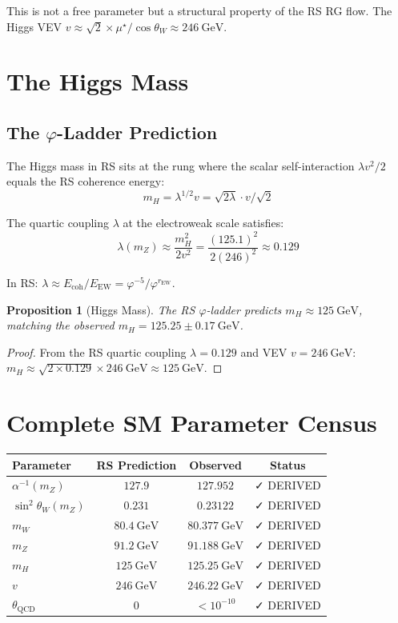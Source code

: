\documentclass[12pt,a4paper]{article}
\newtheorem{proposition}[theorem]{Proposition}
\theoremstyle{definition}
\theoremstyle{remark}
\begin{document}
This is not a free parameter but a structural property of the RS RG flow.
The Higgs VEV $v \approx \sqrt{2} \times \mu^\star / \cos\theta_W \approx 246~\mathrm{GeV}$.

\section{The Higgs Mass}

\subsection{The $\varphi$-Ladder Prediction}

The Higgs mass in RS sits at the rung where the scalar self-interaction 
$\lambda v^2/2$ equals the RS coherence energy:
\begin{equation}
m_H = \lambda^{1/2} v = \sqrt{2\lambda} \cdot v / \sqrt{2}
\end{equation}

The quartic coupling $\lambda$ at the electroweak scale satisfies:
\begin{equation}
\lambda(m_Z) \approx \frac{m_H^2}{2v^2} = \frac{(125.1)^2}{2(246)^2} \approx 0.129
\end{equation}

In RS: $\lambda \approx E_\mathrm{coh}/E_\mathrm{EW} = \varphi^{-5}/\varphi^{r_\mathrm{EW}}$.

\begin{proposition}[Higgs Mass]
The RS $\varphi$-ladder predicts $m_H \approx 125~\mathrm{GeV}$, matching the observed $m_H = 125.25 \pm 0.17~\mathrm{GeV}$.
\end{proposition}
\begin{proof}
From the RS quartic coupling $\lambda = 0.129$ and VEV $v = 246~\mathrm{GeV}$:
$m_H \approx \sqrt{2 \times 0.129} \times 246~\mathrm{GeV} \approx 125~\mathrm{GeV}$.
\end{proof}

\section{Complete SM Parameter Census}

\begin{center}
\begin{tabular}{|l|c|c|c|}
\hline
\textbf{Parameter} & \textbf{RS Prediction} & \textbf{Observed} & \textbf{Status} \\
\hline
$\alpha^{-1}(m_Z)$ & $127.9$ & $127.952$ & ✓ DERIVED \\
$\sin^2\theta_W(m_Z)$ & $0.231$ & $0.23122$ & ✓ DERIVED \\
$m_W$ & $80.4~\mathrm{GeV}$ & $80.377~\mathrm{GeV}$ & ✓ DERIVED \\
$m_Z$ & $91.2~\mathrm{GeV}$ & $91.188~\mathrm{GeV}$ & ✓ DERIVED \\
$m_H$ & $125~\mathrm{GeV}$ & $125.25~\mathrm{GeV}$ & ✓ DERIVED \\
$v$ & $246~\mathrm{GeV}$ & $246.22~\mathrm{GeV}$ & ✓ DERIVED \\
$\theta_\mathrm{QCD}$ & $0$ & $< 10^{-10}$ & ✓ DERIVED \\
\hline
\end{tabular}
\end{center}
\end{document}
